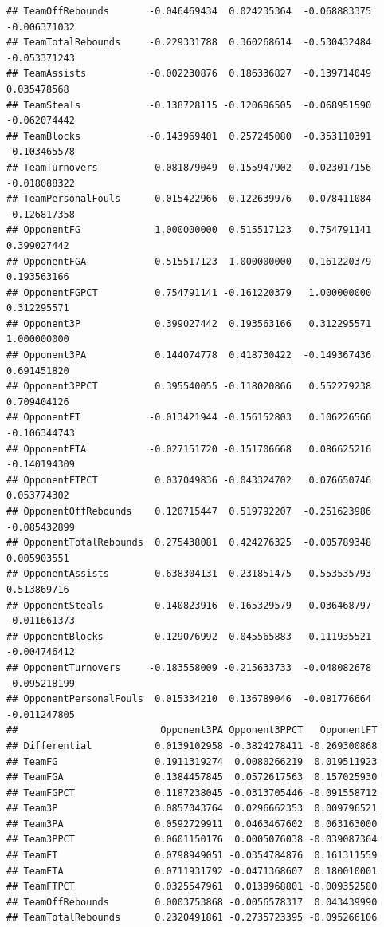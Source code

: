\documentclass[]{book}
\begin{document}
\begin{verbatim}
## TeamOffRebounds       -0.046469434  0.024235364  -0.068883375 -0.006371032
## TeamTotalRebounds     -0.229331788  0.360268614  -0.530432484 -0.053371243
## TeamAssists           -0.002230876  0.186336827  -0.139714049  0.035478568
## TeamSteals            -0.138728115 -0.120696505  -0.068951590 -0.062074442
## TeamBlocks            -0.143969401  0.257245080  -0.353110391 -0.103465578
## TeamTurnovers          0.081879049  0.155947902  -0.023017156 -0.018088322
## TeamPersonalFouls     -0.015422966 -0.122639976   0.078411084 -0.126817358
## OpponentFG             1.000000000  0.515517123   0.754791141  0.399027442
## OpponentFGA            0.515517123  1.000000000  -0.161220379  0.193563166
## OpponentFGPCT          0.754791141 -0.161220379   1.000000000  0.312295571
## Opponent3P             0.399027442  0.193563166   0.312295571  1.000000000
## Opponent3PA            0.144074778  0.418730422  -0.149367436  0.691451820
## Opponent3PPCT          0.395540055 -0.118020866   0.552279238  0.709404126
## OpponentFT            -0.013421944 -0.156152803   0.106226566 -0.106344743
## OpponentFTA           -0.027151720 -0.151706668   0.086625216 -0.140194309
## OpponentFTPCT          0.037049836 -0.043324702   0.076650746  0.053774302
## OpponentOffRebounds    0.120715447  0.519792207  -0.251623986 -0.085432899
## OpponentTotalRebounds  0.275438081  0.424276325  -0.005789348  0.005903551
## OpponentAssists        0.638304131  0.231851475   0.553535793  0.513869716
## OpponentSteals         0.140823916  0.165329579   0.036468797 -0.011661373
## OpponentBlocks         0.129076992  0.045565883   0.111935521 -0.004746412
## OpponentTurnovers     -0.183558009 -0.215633733  -0.048082678 -0.095218199
## OpponentPersonalFouls  0.015334210  0.136789046  -0.081776664 -0.011247805
##                         Opponent3PA Opponent3PPCT   OpponentFT
## Differential           0.0139102958 -0.3824278411 -0.269300868
## TeamFG                 0.1911319274  0.0080266219  0.019511923
## TeamFGA                0.1384457845  0.0572617563  0.157025930
## TeamFGPCT              0.1187238045 -0.0313705446 -0.091558712
## Team3P                 0.0857043764  0.0296662353  0.009796521
## Team3PA                0.0592729911  0.0463467602  0.063163000
## Team3PPCT              0.0601150176  0.0005076038 -0.039087364
## TeamFT                 0.0798949051 -0.0354784876  0.161311559
## TeamFTA                0.0711931792 -0.0471368607  0.180010001
## TeamFTPCT              0.0325547961  0.0139968801 -0.009352580
## TeamOffRebounds        0.0003753868 -0.0056578317  0.043439990
## TeamTotalRebounds      0.2320491861 -0.2735723395 -0.095266106

\end{verbatim}
\end{document}
